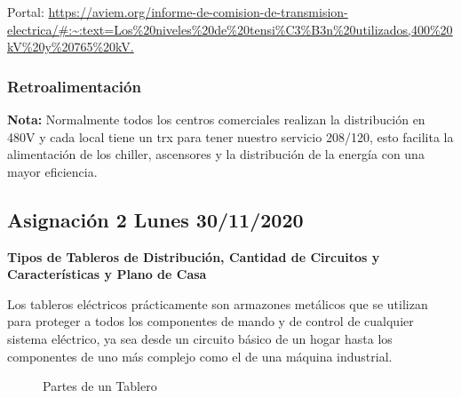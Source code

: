 \documentclass[11pt,letterpaper]{article}
\begin{document}
Portal: \url{https://aviem.org/informe-de-comision-de-transmision-electrica/#:~:text=Los%20niveles%20de%20tensi%C3%B3n%20utilizados,400%20kV%20y%20765%20kV.}


\subsubsection{Retroalimentación}
\textbf{Nota:} Normalmente todos los centros comerciales realizan la distribución en 480V y cada local tiene un trx para tener nuestro servicio 208/120, esto facilita la alimentación de los chiller, ascensores y la distribución de la energía con una mayor eficiencia.\\

\subsection{Asignación 2 Lunes 30/11/2020}
\textbf{Tipos de Tableros de Distribución, Cantidad de Circuitos y Características y Plano de Casa}

	Los tableros eléctricos prácticamente son armazones metálicos que se utilizan para proteger a todos los componentes de mando y de control de cualquier sistema eléctrico, ya sea desde un circuito básico de un hogar hasta los componentes de uno más complejo como el de una máquina industrial.

\begin{figure}[ht!]
	\centering
	\caption{Partes de un Tablero}
\end{figure}
\end{document}
